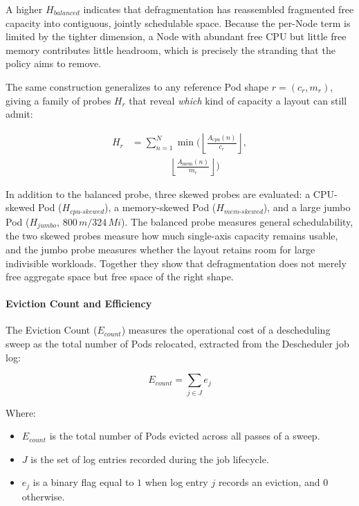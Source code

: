 A higher \(H_{balanced}\) indicates that defragmentation has reassembled fragmented free capacity into contiguous, jointly schedulable space. Because the per-Node term is limited by the tighter dimension, a Node with abundant free CPU but little free memory contributes little headroom, which is precisely the stranding that the policy aims to remove.

The same construction generalizes to any reference Pod shape \(r = (c_r, m_r)\), giving a family of probes \(H_r\) that reveal \emph{which} kind of capacity a layout can still admit:

\[
\begin{aligned}
H_r
&=
\sum_{n=1}^{N}
\min\!\Biggl(
\left\lfloor
\frac{A_{\text{cpu}}(n)}{c_r}
\right\rfloor,\\
&\qquad\qquad
\left\lfloor
\frac{A_{\text{mem}}(n)}{m_r}
\right\rfloor
\Biggr)
\end{aligned}
\]

In addition to the balanced probe, three skewed probes are evaluated: a CPU-skewed Pod (\(H_{cpu\text{-}skewed}\)), a memory-skewed Pod (\(H_{mem\text{-}skewed}\)), and a large jumbo Pod (\(H_{jumbo}\), \(800\,m/324\,Mi\)). The balanced probe measures general schedulability, the two skewed probes measure how much single-axis capacity remains usable, and the jumbo probe measures whether the layout retains room for large indivisible workloads. Together they show that defragmentation does not merely free aggregate space but free space of the right shape.

\paragraph{Eviction Count and Efficiency}
\label{subsubsec:defrag_metric_eviction}
The Eviction Count (\(E_{count}\)) measures the operational cost of a descheduling sweep as the total number of Pods relocated, extracted from the Descheduler job log:

\[
E_{count}
=
\sum_{j \in J} e_j
\]

Where:

\begin{itemize}
    \item \(E_{count}\) is the total number of Pods evicted across all passes of a sweep.

    \item \(J\) is the set of log entries recorded during the job lifecycle.

    \item \(e_j\) is a binary flag equal to \(1\) when log entry \(j\) records an eviction, and \(0\) otherwise.
\end{itemize}

